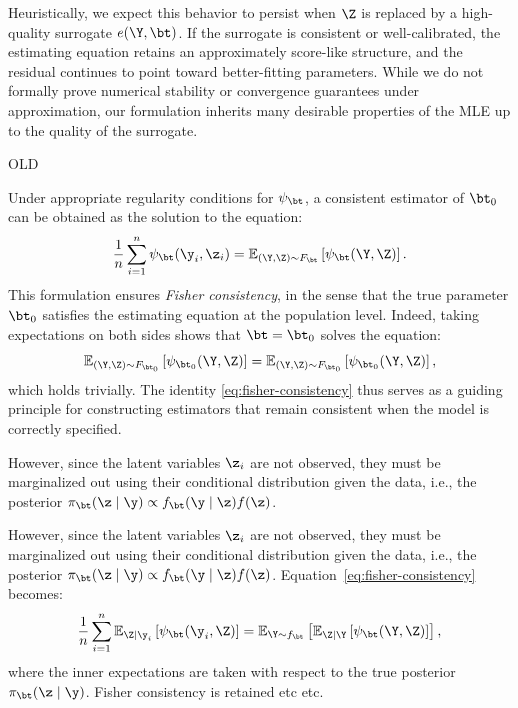 Heuristically, we expect this behavior to persist when \( \Z \) is replaced by a high-quality surrogate \( e(\Y, \bt) \). If the surrogate is consistent or well-calibrated, the estimating equation retains an approximately score-like structure, and the residual continues to point toward better-fitting parameters. While we do not formally prove numerical stability or convergence guarantees under approximation, our formulation inherits many desirable properties of the MLE up to the quality of the surrogate.





{\color{red} OLD}


Under appropriate regularity conditions for $\psi_\bt$, a consistent estimator of $\bt_0$ can be obtained as the solution to the equation:
\begin{equation}
\label{eq:fisher-consistency}
\frac{1}{n} \sum_{i=1}^n \psi_\bt(\y_i, \z_i) = \mathbb{E}_{(\Y, \Z) \sim F_\bt} \left[ \psi_\bt(\Y, \Z) \right].
\end{equation}
This formulation ensures \emph{Fisher consistency}, in the sense that the true parameter $\bt_0$ satisfies the estimating equation at the population level. Indeed, taking expectations on both sides shows that $\bt = \bt_0$ solves the equation:
\[
\mathbb{E}_{(\Y, \Z) \sim F_{\bt_0}} \left[ \psi_{\bt_0}(\Y, \Z) \right] = \mathbb{E}_{(\Y, \Z) \sim F_{\bt_0}} \left[ \psi_{\bt_0}(\Y, \Z) \right],
\]
which holds trivially. The identity \eqref{eq:fisher-consistency} thus serves as a guiding principle for constructing estimators that remain consistent when the model is correctly specified.



However, since the latent variables $\z_i$ are not observed, they must be marginalized out using their conditional distribution given the data, i.e., the posterior $\pi_\bt(\z \mid \y) \propto f_\bt(\y \mid \z)f(\z)$.

However, since the latent variables $\z_i$ are not observed, they must be marginalized out using their conditional distribution given the data, i.e., the posterior $\pi_\bt(\z \mid \y) \propto f_\bt(\y \mid \z)f(\z)$. Equation~\eqref{eq:fisher-consistency} becomes:
\begin{equation}
\label{eq:law-total-expectation}
\frac{1}{n} \sum_{i=1}^n \mathbb{E}_{\Z \mid \y_i} \left[ \psi_\bt(\y_i, \Z) \right]
=
\mathbb{E}_{\Y \sim f_\bt} \left[ \mathbb{E}_{\Z \mid \Y} \left[ \psi_\bt(\Y, \Z) \right] \right],
\end{equation}
where the inner expectations are taken with respect to the true posterior $\pi_\bt(\z \mid \y)$. Fisher consistency is retained etc etc.


